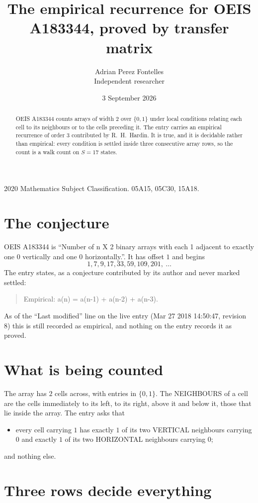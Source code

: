 \documentclass[11pt,a4paper]{article}
\title{The empirical recurrence for OEIS A183344, proved by transfer matrix}
\author{Adrian Perez Fontelles\\ \small Independent researcher}
\date{3 September 2026}
\theoremstyle{plain}
\theoremstyle{definition}
\begin{document}
\maketitle

\begin{abstract}
OEIS A183344 counts arrays of width $2$ over $\{0,1\}$ under local conditions relating each cell
to its neighbours or to the cells preceding it. The entry carries an empirical recurrence of
order $3$ contributed by R.~H.~Hardin. It is true, and it is decidable rather than
empirical: every condition is settled inside three consecutive array rows, so the count is a
walk count on $S=17$ states.
\end{abstract}

\noindent\small 2020 Mathematics Subject Classification. 05A15, 05C30, 15A18.\normalsize

\section{The conjecture}

OEIS A183344 is ``Number of n X 2 binary arrays with each 1 adjacent to exactly one 0 vertically and one 0 horizontally.''. It has offset $1$ and begins
\[
1, 7, 9, 17, 33, 59, 109, 201,\ \dots
\]
The entry states, as a conjecture contributed by its author and never marked settled:
\begin{quote}
Empirical: a(n) = a(n-1) + a(n-2) + a(n-3).
\end{quote}
As of the ``Last modified'' line on the live entry (Mar 27 2018 14:50:47, revision 8) this is still
recorded as empirical, and nothing on the entry records it as proved.

\section{What is being counted}

The array has $2$ cells across, with entries in $\{0,1\}$. The NEIGHBOURS of a cell are the
cells immediately to its left, to its right, above it and below it, those that lie inside the
array. The entry asks that
\begin{itemize}
\item every cell carrying $1$ has exactly $1$ of its two VERTICAL neighbours carrying $0$ and exactly $1$ of its two HORIZONTAL neighbours carrying $0$;
\end{itemize}
and nothing else.

\section{Three rows decide everything}
\end{document}
